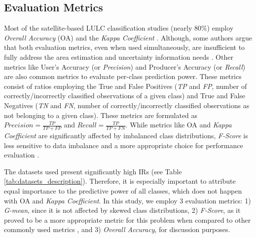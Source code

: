 \documentclass[parskip=full]{scrartcl}
\begin{document}
\subsection{Evaluation Metrics}
Most of the satellite-based LULC classification studies (nearly 80\%) employ
\textit{Overall Accuracy} (OA) and the \textit{Kappa Coefficient}
\cite{Gavade2019}. Although, some authors argue that both evaluation
metrics, even when used simultaneously, are insufficient to fully address the
area estimation and uncertainty information needs \cite{Olofsson2013,Pontius2011}.
Other metrics like User's Accuracy (or \textit{Precision}) and Producer's
Accuracy (or \textit{Recall}) are also common metrics to evaluate
per-class prediction power. These metrics consist of ratios employing the True
and False Positives (\textit{TP} and \textit{FP},
number of correctly/incorrectly classified observations of a given class) and
True and False Negatives  (\textit{TN} and \textit{FN},
number of correctly/incorrectly classified observations as not belonging to a
given class). These metrics are formulated as $Precision = \frac{TP}{TP+FP}$ and
$Recall = \frac{TP}{TP+FN}$. While metrics like OA and \textit{Kappa Coefficient} are
significantly affected by imbalanced class distributions,
\textit{F-Score} is less sensitive to data imbalance and a more
appropriate choice for performance evaluation \cite{Jeni2013}.

The datasets used present significantly high IRs (see Table
\ref{tab:datasets_description}). Therefore, it is especially important to attribute
equal importance to the predictive power of all classes, which does not happen
with OA and \textit{Kappa Coefficient}. In this study, we employ 3 evaluation
metrics: 1) \textit{G-mean}, since it is not affected by skewed class
distributions, 2) \textit{F-Score}, as it proved to be a more
appropriate metric for this problem when compared to other commonly used
metrics \cite{Jeni2013}, and 3) \textit{Overall Accuracy}, for discussion
purposes.
\end{document}
